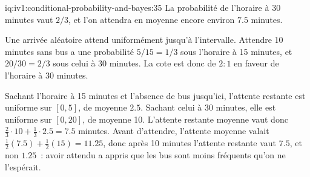 \begin{solution}{iq:iv1:conditional-probability-and-bayes:35}
La probabilité de l'horaire à 30 minutes vaut $2/3$, et l'on attendra en moyenne encore environ $7.5$ minutes.

Une arrivée aléatoire attend uniformément jusqu'à l'intervalle. Attendre 10 minutes sans bus a une probabilité $5/15 = 1/3$ sous l'horaire à 15 minutes, et $20/30 = 2/3$ sous celui à 30 minutes. La cote est donc de $2 : 1$ en faveur de l'horaire à 30 minutes.

Sachant l'horaire à 15 minutes et l'absence de bus jusqu'ici, l'attente restante est uniforme sur $[0, 5]$, de moyenne $2.5$. Sachant celui à 30 minutes, elle est uniforme sur $[0, 20]$, de moyenne 10. L'attente restante moyenne vaut donc $\tfrac23 \cdot 10 + \tfrac13 \cdot 2.5 = 7.5$ minutes. Avant d'attendre, l'attente moyenne valait $\tfrac12(7.5) + \tfrac12(15) = 11.25$, donc après 10 minutes l'attente restante vaut $7.5$, et non $1.25$~: avoir attendu a appris que les bus sont moins fréquents qu'on ne l'espérait.

\end{solution}

